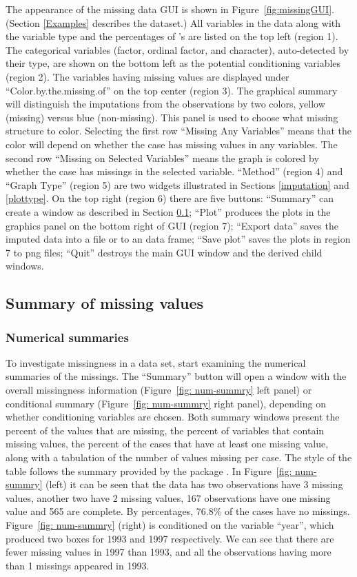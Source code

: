 \documentclass[article]{jss}
\begin{document}
The appearance of the missing data GUI is shown in
Figure~\ref{fig:missingGUI}. (Section \ref{Examples} describes
the dataset.) All variables in the data along with the variable
type and the percentages of 's are listed on the top left
(region 1). The categorical variables (factor, ordinal factor, and
character), auto-detected by their type, are shown on the bottom
left as the potential conditioning variables (region 2). The variables
having missing values are displayed under ``Color.by.the.missing.of''
on the top center (region 3). The graphical summary will distinguish
the imputations from the observations by two colors, yellow (missing)
versus blue (non-missing). This panel is used to choose what missing
structure to color. Selecting the first row ``Missing Any Variables''
means that the color will depend on whether the case has missing
values in any variables. The second row ``Missing on Selected Variables''
means the graph is colored by whether the case has missings in the
selected variable. ``Method'' (region 4) and ``Graph Type'' (region 5)
are two widgets illustrated in Sections \ref{imputation} and
\ref{plottype}. On the top right (region 6) there are five buttons:
``Summary'' can create a window as described in Section \ref{numsum};
``Plot'' produces the plots in the graphics panel on the bottom
right of GUI (region 7); ``Export data'' saves the imputed data
into a file or to an  data frame; ``Save plot'' saves
the plots in region 7 to png files; ``Quit'' destroys the main
GUI window and the derived child windows.

\subsection{Summary of missing values}\label{numsum}

\subsubsection{Numerical summaries}
To investigate missingness in a data set, start examining the
numerical summaries of the missings. The ``Summary'' button will
open a window with the overall missingness information
(Figure~\ref{fig: num-summry} left panel) or conditional summary
(Figure~\ref{fig: num-summry} right panel), depending on whether
conditioning variables are chosen. Both summary windows present
the percent of the values that are missing, the percent of variables
that contain missing values, the percent of the cases that have at
least one missing value, along with a tabulation of the number of
values missing per case. The style of the table follows the summary
provided by the package .  In Figure~\ref{fig: num-summry}
(left) it can be seen that the data has two observations have 3
missing values, another two have 2 missing values, 167 observations
have one missing value and 565 are complete. By percentages, 76.8\%
of the cases have no missings. Figure~\ref{fig: num-summry} (right)
is conditioned on the variable ``year'', which produced two boxes
for 1993 and 1997 respectively. We can see that there are fewer
missing values in 1997 than 1993, and all the observations having
more than 1 missings appeared in 1993.
\end{document}
